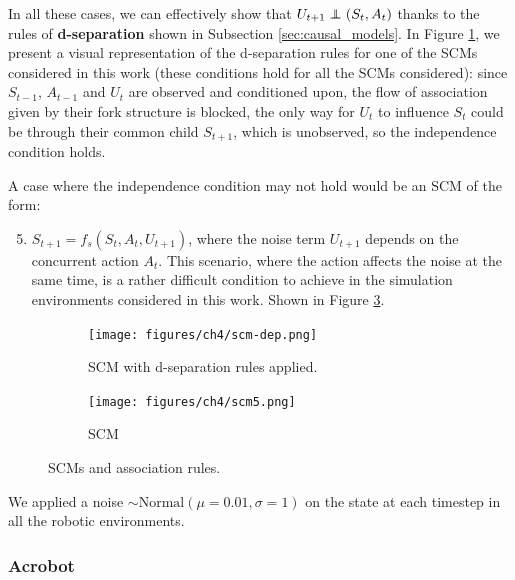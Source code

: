 In all these cases, we can effectively show that
$U_{t+1} \independent (S_t, A_t)$ thanks to the rules
of \textbf{d-separation} shown in Subsection \ref{sec:causal_models}.
In Figure \ref{fig:scm-dep}, we present a visual representation
of the d-separation rules for one of the SCMs considered in this work
(these conditions hold for all the SCMs considered):
since $S_{t-1}$, $A_{t-1}$ and $U_t$ are observed and conditioned upon,
the flow of association given by their fork structure is blocked,
the only way for $U_t$ to influence $S_t$ could be
through their common child $S_{t+1}$, which is unobserved,
so the independence condition holds.

A case where the independence condition may not hold would be an
SCM of the form:
\begin{enumerate}
    \setcounter{enumi}{4}
    \item $S_{t+1} = f_s(S_t, A_t, U_{t+1})$,
    where the noise term $U_{t+1}$ depends on the concurrent action
    $A_t$. This scenario, where the action affects the noise at the same time,
    is a rather difficult condition to achieve in the simulation
    environments considered in this work. Shown in Figure \ref{fig:scm5}.
\end{enumerate}
\begin{figure}[h]
    \begin{subfigure}[t]{.41\textwidth}
        \centering
        \texttt{[image: figures/ch4/scm-dep.png]}
        \caption{SCM with d-separation rules applied.}
        \label{fig:scm-dep}
    \end{subfigure}
    \hfill
    \begin{subfigure}[t]{.41\textwidth}
        \centering
        \texttt{[image: figures/ch4/scm5.png]}
        \caption{ SCM}
        \label{fig:scm5}
    \end{subfigure}
    \caption{SCMs and association rules.}
\end{figure}

We applied a
noise $\sim \text{Normal}(\mu=0.01, \sigma=1)$ on the state at each timestep
in all the robotic environments.

\subsubsection{Acrobot}

